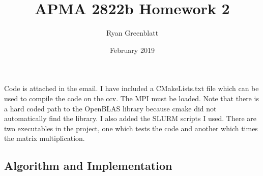 \documentclass{article}
\title{APMA 2822b Homework 2}
\author{Ryan Greenblatt}
\date{February 2019}
\begin{document}
\setlength\parindent{0pt}

\renewcommand{\thesubsection}{\alph{subsection}}

\maketitle

\section{}

Code is attached in the email. I have included a CMakeLists.txt file which can be used to compile
the code on the ccv. The MPI must be loaded. Note that there is a hard coded path to the OpenBLAS library because
cmake did not automatically find the library. I also added the SLURM scripts I used.
There are two executables in the project, one which tests the code and another which times the matrix
multiplication.

\subsection*{Algorithm and Implementation}
\end{document}
